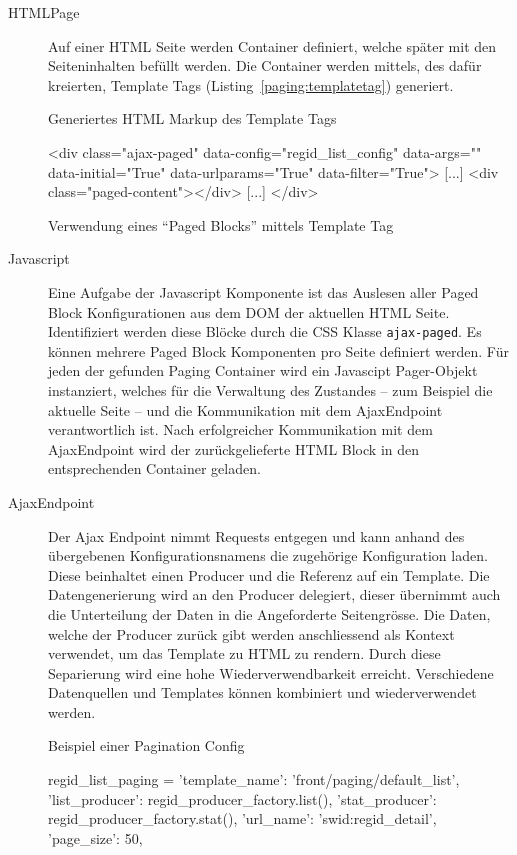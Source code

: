 \begin{description}
	\item[HTMLPage] Auf einer HTML Seite werden Container definiert, welche später
	mit den Seiteninhalten befüllt werden. Die Container werden mittels, des dafür
	kreierten, Template Tags (Listing~\ref{paging:templatetag}) generiert.

\begin{listing}[H]
\caption{Generiertes HTML Markup des Template Tags}
\label{paging:container}
\begin{htmlcode}
<div class="ajax-paged"
  data-config="regid_list_config"
  data-args="{}"
  data-initial="True"
  data-urlparams="True"
  data-filter="True">
	[...]
	<div class="paged-content"></div>
	[...]
</div>
\end{htmlcode}
\end{listing}

\begin{listing}
\caption{Verwendung eines \enquote{Paged Blocks} mittels Template Tag}
\label{paging:templatetag}
\begin{pythoncode}
{%
\end{pythoncode}
\end{listing}

	\item[Javascript] Eine Aufgabe der Javascript Komponente ist das Auslesen aller
	Paged Block Konfigurationen aus dem DOM der aktuellen HTML Seite. Identifiziert
	werden diese Blöcke durch die CSS Klasse \texttt{ajax-paged}. Es können mehrere
	Paged Block Komponenten pro Seite definiert werden. Für jeden der gefunden
	Paging Container wird ein Javascipt Pager-Objekt instanziert, welches für die
	Verwaltung des Zustandes -- zum Beispiel die aktuelle Seite -- und die
	Kommunikation mit dem AjaxEndpoint verantwortlich ist. Nach erfolgreicher
	Kommunikation mit dem AjaxEndpoint wird der zurückgelieferte HTML Block in den
	entsprechenden Container geladen. 

	\item [AjaxEndpoint] Der Ajax Endpoint nimmt Requests entgegen und kann anhand
	des übergebenen Konfigurationsnamens die zugehörige Konfiguration laden. Diese
	beinhaltet einen Producer und die Referenz auf ein Template. Die
	Datengenerierung wird an den Producer delegiert, dieser übernimmt auch die
	Unterteilung der Daten in die Angeforderte  Seitengrösse. Die Daten, welche der
	Producer zurück gibt werden anschliessend als Kontext verwendet, um das
	Template zu HTML zu rendern. Durch diese Separierung wird eine hohe
	Wiederverwendbarkeit erreicht. Verschiedene Datenquellen und Templates können
	kombiniert und wiederverwendet werden.
\begin{listing}
\caption{Beispiel einer Pagination Config}
\begin{pythoncode}
regid_list_paging = {
    'template_name': 'front/paging/default_list',
    'list_producer': regid_producer_factory.list(),
    'stat_producer': regid_producer_factory.stat(),
    'url_name': 'swid:regid_detail',
    'page_size': 50,
}
\end{pythoncode}
\end{listing}


\end{description}

